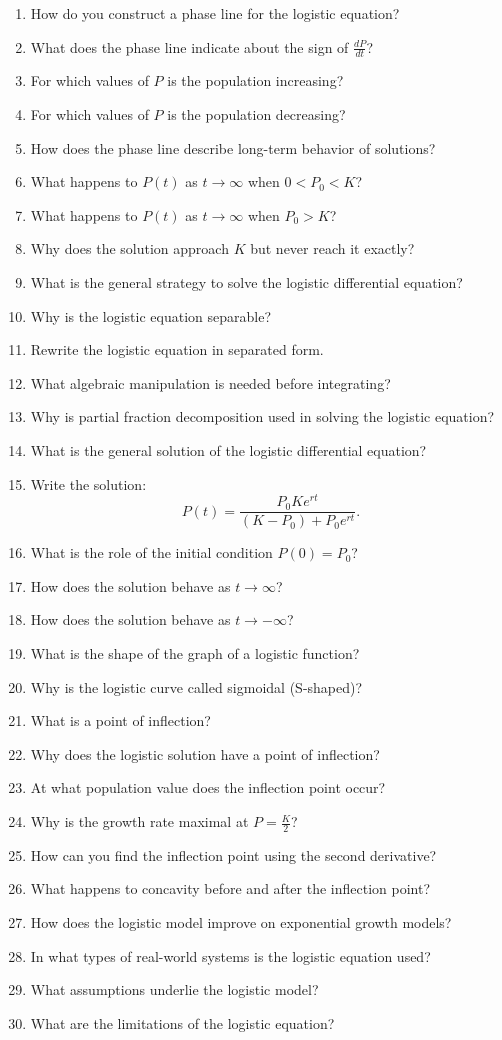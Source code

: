 \begin{enumerate}
  \item How do you construct a phase line for the logistic equation?
  \item What does the phase line indicate about the sign of \(\frac{dP}{dt}\)?
  \item For which values of \(P\) is the population increasing?
  \item For which values of \(P\) is the population decreasing?
  \item How does the phase line describe long-term behavior of solutions?
  \item What happens to \(P(t)\) as \(t \to \infty\) when \(0 < P_{0} < K\)?
  \item What happens to \(P(t)\) as \(t \to \infty\) when \(P_{0} > K\)?
  \item Why does the solution approach \(K\) but never reach it exactly?
  \item What is the general strategy to solve the logistic differential equation?
  \item Why is the logistic equation separable?
  \item Rewrite the logistic equation in separated form.
  \item What algebraic manipulation is needed before integrating?
  \item Why is partial fraction decomposition used in solving the logistic equation?
  \item What is the general solution of the logistic differential equation?
  \item Write the solution:
    \[ P(t)=\frac{P_{0} K e^{rt}}{(K-P_{0})+P_{0} e^{rt}}. \]
  \item What is the role of the initial condition \(P(0)=P_{0}\)?
  \item How does the solution behave as \(t \to \infty\)?
  \item How does the solution behave as \(t \to -\infty\)?
  \item What is the shape of the graph of a logistic function?
  \item Why is the logistic curve called sigmoidal (S-shaped)?
  \item What is a point of inflection?
  \item Why does the logistic solution have a point of inflection?
  \item At what population value does the inflection point occur?
  \item Why is the growth rate maximal at \(P = \frac{K}{2}\)?
  \item How can you find the inflection point using the second derivative?
  \item What happens to concavity before and after the inflection point?
  \item How does the logistic model improve on exponential growth models?
  \item In what types of real-world systems is the logistic equation used?
  \item What assumptions underlie the logistic model?
  \item What are the limitations of the logistic equation?
\end{enumerate}
